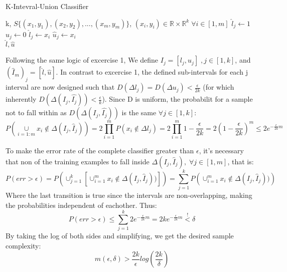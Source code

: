 \begin{algorithm}
    \caption{K-Intevral-Union Classifier}\label{alg:cap}
    \begin{algorithmic}
        \Require k, $S\{(x_1, y_1), (x_2, y_2), ..., (x_m, y_m)\}$, $(x_i, y_i) \in \mathbb{R} \times \mathbb{R}^k \; \forall i \in [1, m]$
            \State $\hat{l}_j \gets 1$
            \State $\hat{u}_j \gets 0$
        \EndFor
                        \State $\hat{l}_j \gets x_i$
                    \EndIf
                        \State $\hat{u}_j \gets x_i$
                    \EndIf
                \EndIf
            \EndFor
        \EndFor \\
    \Return $\hat{l}, \hat{u}$
    \end{algorithmic}
\end{algorithm}

Following the same logic of excercise 1, We define $I_j = [l_j, u_j] \;, j\in [1, k]$, and $(\hat{I}_m)_j = [\hat{l}, \hat{u}]$.
In contrast to excercise 1, the defined sub-intervals for each j interval are now designed such that $D(\Delta l_j) = D(\Delta u_j) < \frac{\epsilon}{2k}$
(for which inherently $D(\Delta(I_j, \hat{I_j})) < \frac{\epsilon}{k}$). Since D is uniform, the probabilit for a sample not to fall within as $D(\Delta(I_j, \hat{I_j}))$ is the same $\forall j\in[1, k]$:
\begin{equation*}
    P(\underset{i=1:m}{\cup} x_i \notin \Delta(I_j, \hat{I}_j)) = 2\prod_{i=1}^{m}P(x_i \notin \Delta l_j) 
    = 2\prod_{i=1}^{m} 1-\frac{\epsilon}{2k}= 2(1-\frac{\epsilon}{2k})^m \leq 2e^{-\frac{\epsilon}{2k}m}
\end{equation*}


To make the error rate of the complete classifier greater than $\epsilon$, it's necessary that non of the training examples to fall inside
$\Delta(I_j, \hat{I}_j), \; \forall j\in[1,m]$, that is:
\begin{equation*}
    P(err > \epsilon) = P\left(\cup_{j=1}^{k} \left[ \cup_{i=1}^{m} x_i \notin \Delta(I_j, \hat{I}_j)) \right]\right) = \sum_{j=1}^{k} P\left(\cup_{i=1}^{m} x_i \notin \Delta(I_j, \hat{I}_j))\right)
\end{equation*}
Where the last transition is true since the intervals are non-overlapping, making the probabilities independent of eachother.
Thus:
\begin{equation*}
    P(err > \epsilon) \leq \sum_{j=1}^{k} 2e^{-\frac{\epsilon}{2k}m} = 2ke^{-\frac{\epsilon}{2k}m} \overset{!}{<} \delta
\end{equation*}
By taking the log of both sides and simplifying, we get the desired sample complexity:
\begin{equation*}
    m(\epsilon, \delta) > \frac{2k}{\epsilon} log(\frac{2k}{\delta})
\end{equation*}


